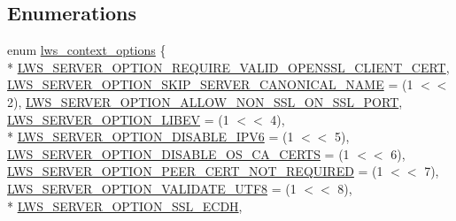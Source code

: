 \subsection*{Enumerations}
\begin{DoxyCompactItemize}
\item 
enum \hyperlink{group__context-and-vhost_ga41c2d763f78cc248df3b9f8645dbd2a5}{lws\+\_\+context\+\_\+options} \{ \\*
\hyperlink{group__context-and-vhost_gga41c2d763f78cc248df3b9f8645dbd2a5a274ed462a1a9239eb6ddf9007f5b7092}{L\+W\+S\+\_\+\+S\+E\+R\+V\+E\+R\+\_\+\+O\+P\+T\+I\+O\+N\+\_\+\+R\+E\+Q\+U\+I\+R\+E\+\_\+\+V\+A\+L\+I\+D\+\_\+\+O\+P\+E\+N\+S\+S\+L\+\_\+\+C\+L\+I\+E\+N\+T\+\_\+\+C\+E\+RT}, 
\hyperlink{group__context-and-vhost_gga41c2d763f78cc248df3b9f8645dbd2a5a6582c985ee0ceaadc1d277030eae2d7c}{L\+W\+S\+\_\+\+S\+E\+R\+V\+E\+R\+\_\+\+O\+P\+T\+I\+O\+N\+\_\+\+S\+K\+I\+P\+\_\+\+S\+E\+R\+V\+E\+R\+\_\+\+C\+A\+N\+O\+N\+I\+C\+A\+L\+\_\+\+N\+A\+ME} = (1 $<$$<$ 2), 
\hyperlink{group__context-and-vhost_gga41c2d763f78cc248df3b9f8645dbd2a5a1cc4562d05cba52a6dfa0697a65ade0d}{L\+W\+S\+\_\+\+S\+E\+R\+V\+E\+R\+\_\+\+O\+P\+T\+I\+O\+N\+\_\+\+A\+L\+L\+O\+W\+\_\+\+N\+O\+N\+\_\+\+S\+S\+L\+\_\+\+O\+N\+\_\+\+S\+S\+L\+\_\+\+P\+O\+RT}, 
\hyperlink{group__context-and-vhost_gga41c2d763f78cc248df3b9f8645dbd2a5a273d9975675130de0c6dc937dde7c8a6}{L\+W\+S\+\_\+\+S\+E\+R\+V\+E\+R\+\_\+\+O\+P\+T\+I\+O\+N\+\_\+\+L\+I\+B\+EV} = (1 $<$$<$ 4), 
\\*
\hyperlink{group__context-and-vhost_gga41c2d763f78cc248df3b9f8645dbd2a5a34ab36e68c0d593b6f19b8d5ef1240a9}{L\+W\+S\+\_\+\+S\+E\+R\+V\+E\+R\+\_\+\+O\+P\+T\+I\+O\+N\+\_\+\+D\+I\+S\+A\+B\+L\+E\+\_\+\+I\+P\+V6} = (1 $<$$<$ 5), 
\hyperlink{group__context-and-vhost_gga41c2d763f78cc248df3b9f8645dbd2a5a4933347a821e73c3f1e13fb6bfc7ad93}{L\+W\+S\+\_\+\+S\+E\+R\+V\+E\+R\+\_\+\+O\+P\+T\+I\+O\+N\+\_\+\+D\+I\+S\+A\+B\+L\+E\+\_\+\+O\+S\+\_\+\+C\+A\+\_\+\+C\+E\+R\+TS} = (1 $<$$<$ 6), 
\hyperlink{group__context-and-vhost_gga41c2d763f78cc248df3b9f8645dbd2a5ac56a8a6590e74a8016d0fae09fb404fc}{L\+W\+S\+\_\+\+S\+E\+R\+V\+E\+R\+\_\+\+O\+P\+T\+I\+O\+N\+\_\+\+P\+E\+E\+R\+\_\+\+C\+E\+R\+T\+\_\+\+N\+O\+T\+\_\+\+R\+E\+Q\+U\+I\+R\+ED} = (1 $<$$<$ 7), 
\hyperlink{group__context-and-vhost_gga41c2d763f78cc248df3b9f8645dbd2a5aa0158b4e85420811e6b0f1378c6ded0f}{L\+W\+S\+\_\+\+S\+E\+R\+V\+E\+R\+\_\+\+O\+P\+T\+I\+O\+N\+\_\+\+V\+A\+L\+I\+D\+A\+T\+E\+\_\+\+U\+T\+F8} = (1 $<$$<$ 8), 
\\*
\hyperlink{group__context-and-vhost_gga41c2d763f78cc248df3b9f8645dbd2a5a1b2f8bde0f62adc7ebe81b2043f34c0c}{L\+W\+S\+\_\+\+S\+E\+R\+V\+E\+R\+\_\+\+O\+P\+T\+I\+O\+N\+\_\+\+S\+S\+L\+\_\+\+E\+C\+DH}, 

\end{DoxyCompactItemize}
